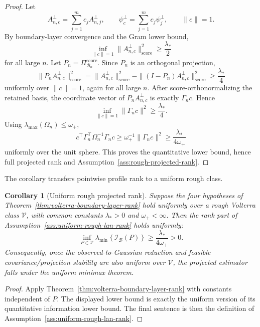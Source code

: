 \documentclass[11pt,a4paper]{amsart}
\theoremstyle{plain}
\newtheorem{corollary}[theorem]{Corollary}
\theoremstyle{definition}
\theoremstyle{remark}
\newcommand{\scrB}{\mathcal{B}}
\newcommand{\scrI}{\mathcal{I}}
\begin{document}
\begin{proof}
Let
\[
        A_{n,c}^\perp=\sum_{j=1}^m c_jA_{n,j}^\perp,
        \qquad
        \psi_c^\perp=\sum_{j=1}^m c_j\psi_j^\perp,
        \qquad
        \|c\|=1.
\]
By boundary-layer convergence and the Gram lower bound,
\[
        \inf_{\|c\|=1}\|A_{n,c}^\perp\|_{\mathrm{score}}^2
        \ge
        \frac{\lambda_*}{2}
\]
for all large \(n\).  Let \(P_n=\Pi_{\scrB_n}^{\mathrm{score}}\).  Since \(P_n\) is an orthogonal
projection,
\[
        \|P_nA_{n,c}^\perp\|_{\mathrm{score}}^2
        =
        \|A_{n,c}^\perp\|_{\mathrm{score}}^2
        -
        \|(I-P_n)A_{n,c}^\perp\|_{\mathrm{score}}^2
        \ge
        \frac{\lambda_*}{4}
\]
uniformly over \(\|c\|=1\), again for all large \(n\).  After score-orthonormalizing the retained
basis, the coordinate vector of \(P_nA_{n,c}^\perp\) is exactly \(\Gamma_nc\).  Hence
\[
        \inf_{\|c\|=1}\|\Gamma_nc\|^2
        \ge
        \frac{\lambda_*}{4}.
\]
Using \(\lambda_{\max}(\Omega_n)\le\omega_+\),
\[
        c^\top\Gamma_n^\top\Omega_n^{-1}\Gamma_nc
        \ge
        \omega_+^{-1}\|\Gamma_nc\|^2
        \ge
        \frac{\lambda_*}{4\omega_+}
\]
uniformly over the unit sphere.  This proves the quantitative lower bound, hence full projected
rank and Assumption~\ref{ass:rough-projected-rank}.
\end{proof}

The corollary transfers pointwise profile rank to a uniform rough class.

\begin{corollary}[Uniform rough projected rank]\label{cor:uniform-rough-projected-rank}
Suppose the four hypotheses of Theorem~\ref{thm:volterra-boundary-layer-rank} hold uniformly over a
rough Volterra class \(\mathcal V\), with common constants \(\lambda_*>0\) and \(\omega_+<\infty\).
Then the rank part of Assumption~\ref{ass:uniform-rough-lan-rank} holds uniformly:
\[
        \inf_{P\in\mathcal V}
        \lambda_{\min}
        \left\{
        \scrI_{\scrB}(P)
        \right\}
        \ge
        \frac{\lambda_*}{4\omega_+}>0.
\]
Consequently, once the observed-to-Gaussian reduction and feasible covariance/projection
stability are also uniform over \(\mathcal V\), the projected estimator falls under the uniform
minimax theorem.
\end{corollary}

\begin{proof}
Apply Theorem~\ref{thm:volterra-boundary-layer-rank} with constants independent of \(P\).  The
displayed lower bound is exactly the uniform version of its quantitative information lower bound.
The final sentence is then the definition of Assumption~\ref{ass:uniform-rough-lan-rank}.
\end{proof}
\end{document}
